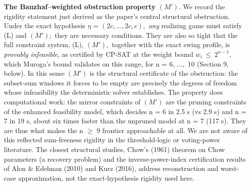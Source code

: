 \documentclass[
]{article}
\begin{document}
\textbf{The Banzhaf--weighted obstruction property \((M').\)} We record
the rigidity statement just derived as the paper's central structural
obstruction. Under the exact hypothesis \(\eta\) = \((2c,\dots,2c,c),\)
\emph{any} realizing game must satisfy (L) and \((M');\) they are
necessary conditions. They are also so tight that the full constraint
system, (L), \((M'),\) together with the exact swing profile, is
\emph{provably infeasible}, as certified by CP-SAT at the weight bound
\(w_i\ \le\ 2^{n-1},\) which Muroga's bound validates on this range, for
n = 6, \(\dots,\) 10 (Section 9, below). In this sense \((M')\) is the
structural certificate of the obstruction: the subset-sum windows it
forces to be empty are precisely the degrees of freedom whose
infeasibility the deterministic solver establishes. The property does
computational work: the mirror constraints of \((M')\) are the pruning
constraints of the enhanced feasibility model, which decides n = 6 in
2.5 s (vs 2.9 s) and n = 7 in 19 s, about six times faster than the
unpruned model at n = 7 (117 s). They are thus what makes the n \(\ge\)
9 frontier approachable at all. We are not aware of this reflected
sum-freeness rigidity in the threshold-logic or voting-power literature.
The closest structural studies, Chow's (1961) theorem on Chow parameters
(a recovery problem) and the inverse-power-index certification results
of Alon \& Edelman (2010) and Kurz (2016), address reconstruction and
worst-case approximation, not the exact-hypothesis rigidity used here.
\end{document}
